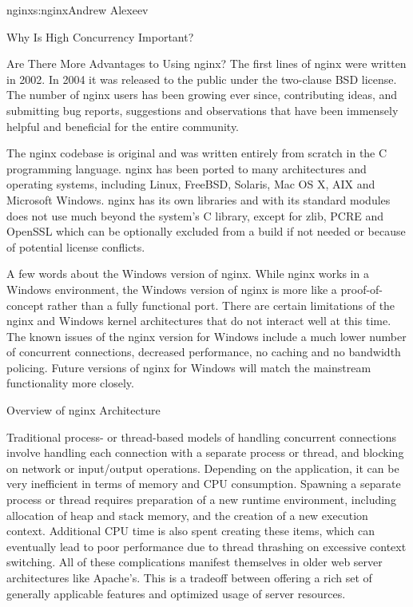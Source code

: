 \begin{aosachapter}{nginx}{s:nginx}{Andrew Alexeev}
\begin{aosasect1}{Why Is High Concurrency Important?}
\begin{aosasect2}{Are There More Advantages to Using nginx?}
The first lines of nginx were written in 2002. In 2004 it was released
to the public under the two-clause BSD license. The number of nginx
users has been growing ever since, contributing ideas, and submitting
bug reports, suggestions and observations that have been immensely
helpful and beneficial for the entire community.

The nginx codebase is original and was written entirely from scratch
in the C programming language. nginx has been ported to many
architectures and operating systems, including Linux, FreeBSD,
Solaris, Mac OS X, AIX and Microsoft Windows. nginx has its own
libraries and with its standard modules does not use much beyond the
system's C library, except for zlib, PCRE and OpenSSL which can be
optionally excluded from a build if not needed or because of potential
license conflicts.

A few words about the Windows version of nginx. While nginx works in a
Windows environment, the Windows version of nginx is more like a
proof-of-concept rather than a fully functional port. There are
certain limitations of the nginx and Windows kernel architectures that
do not interact well at this time. The known issues of the nginx
version for Windows include a much lower number of concurrent
connections, decreased performance, no caching and no bandwidth
policing. Future versions of nginx for Windows will match the
mainstream functionality more closely.

\end{aosasect2}

\end{aosasect1}

\begin{aosasect1}{Overview of nginx Architecture}

Traditional process- or thread-based models of handling concurrent
connections involve handling each connection with a separate process
or thread, and blocking on network or input/output
operations. Depending on the application, it can be very inefficient
in terms of memory and CPU consumption. Spawning a separate process or
thread requires preparation of a new runtime environment, including
allocation of heap and stack memory, and the creation of a new
execution context. Additional CPU time is also spent creating these
items, which can eventually lead to poor performance due to thread
thrashing on excessive context switching. All of these complications
manifest themselves in older web server architectures like
Apache's. This is a tradeoff between offering a rich set of generally
applicable features and optimized usage of server resources.


\end{aosasect1}
\end{aosachapter}
